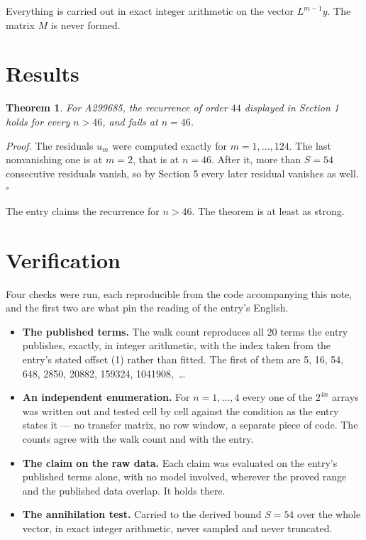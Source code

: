 \documentclass[11pt]{article}
\newtheorem{theorem}{Theorem}
\theoremstyle{definition}
\begin{document}
Everything is carried out in exact integer arithmetic on the vector $L^{m-1}y$. The matrix $M$ is never formed.

\section{Results}

\begin{theorem} For A299685, the recurrence of order $44$ displayed in Section 1 holds for every $n > 46$, and fails at $n = 46$.\end{theorem}

{\itshape Proof.} The residuals $u_m$ were computed exactly for $m = 1,\dots,124$. The last nonvanishing one is at $m = 2$, that is at $n = 46$. After it, more than $S = 54$ consecutive residuals vanish, so by Section 5 every later residual vanishes as well. $\square$

The entry claims the recurrence for $n > 46$. The theorem is at least as strong.

\section{Verification}

Four checks were run, each reproducible from the code accompanying this note, and the first two are what pin the reading of the entry's English.

\begin{itemize}

\item {\bfseries The published terms.} The walk count reproduces all 20 terms the entry publishes, exactly, in integer arithmetic, with the index taken from the entry's stated offset (1) rather than fitted. The first of them are 5, 16, 54, 648, 2850, 20882, 159324, 1041908,~\dots

\item {\bfseries An independent enumeration.} For $n = 1,\dots,4$ every one of the $2^{4n}$ arrays was written out and tested cell by cell against the condition as the entry states it --- no transfer matrix, no row window, a separate piece of code. The counts agree with the walk count and with the entry.

\item {\bfseries The claim on the raw data.} Each claim was evaluated on the entry's published terms alone, with no model involved, wherever the proved range and the published data overlap. It holds there.

\item {\bfseries The annihilation test.} Carried to the derived bound $S = 54$ over the whole vector, in exact integer arithmetic, never sampled and never truncated.

\end{itemize}
\end{document}
